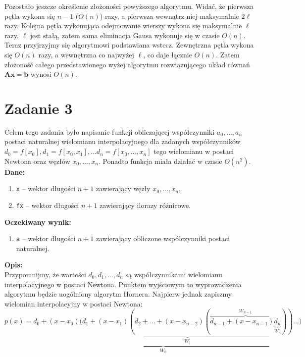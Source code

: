 \documentclass[]{article}
\newcommand{\mA}{\bm{A}}
\newcommand{\vb}{\bm{b}}
\newcommand{\vx}{\bm{x}}
\begin{document}
	Pozostało jeszcze określenie złożoności powyższego algorytmu. Widać, że pierwsza pętla wykona się $n-1$ ($O(n)$) razy, a pierwsza wewnątrz niej maksymalnie $2\ell$ razy. Kolejna pętla wykonująca odejmowanie wierszy wykona się maksymalnie $\ell$ razy. $\ell$ jest stałą, zatem sama eliminacja Gausa wykonuje się w czasie $O(n)$. Teraz przyjrzyjmy się algorytmowi podstawiana wstecz. Zewnętrzna pętla wykona się $O(n)$ razy, a wewnętrzna co najwyżej $\ell$, co daje łącznie $O(n)$. Zatem złożoność całego przedstawionego wyżej algorytmu rozwiązującego układ równań $\mA\vx=\vb$ wynosi $O(n)$.
	\section*{Zadanie 3} 
	
	Celem tego zadania było napisanie funkcji obliczającej współczynniki $a_0,\ldots,a_n$ postaci naturalnej wielomianu interpolacyjnego dla zadanych współczynników $d_0 = f[x_0], d_1 = f[x_0,x_1], \ldots d_n = f[x_0, \ldots, x_n]$ tego wielomianu w postaci Newtona oraz węzłów $x_0, \ldots, x_n$. Ponadto funkcja miała działać w czasie $O(n^2)$.\\
	\textbf{Dane:}
	\begin{enumerate}[]
		\item \texttt{x} -- wektor długości $n+1$ zawierający węzły $x_0, \ldots, x_n$,
		\item \texttt{fx} -- wektor długości $n+1$ zawierający ilorazy różnicowe.
	\end{enumerate}
	\textbf{Oczekiwany wynik:}
	\begin{enumerate}[]
		\item \texttt{a} -- wektor długości $n+1$ zawierający obliczone współczynniki postaci naturalnej.
	\end{enumerate}
	\textbf{Opis:}\\
	Przypomnijmy, że wartości $d_0, d_1, \ldots, d_n$ są współczynnikami wielomianu interpolacyjnego w postaci Newtona. Punktem wyjściowym to wyprowadzenia algorytmu będzie uogólniony algorytm Hornera. Najpierw jednak zapiszmy wielomian interpolacyjny w postaci Newtona: 
	$$ p(x) = \underbrace{d_0 + (x-x_0)(\underbrace{d_1 + (x-x_1)
	(d_2 + \ldots + (x-x_{n-2})(\overbrace{d_{n-1}+(x-x_{n-1})\underbrace{d_n}_{W_n}}^{W_{n-1}}))}_{W_1}}_{W_0}\ldots)$$
\end{document}
